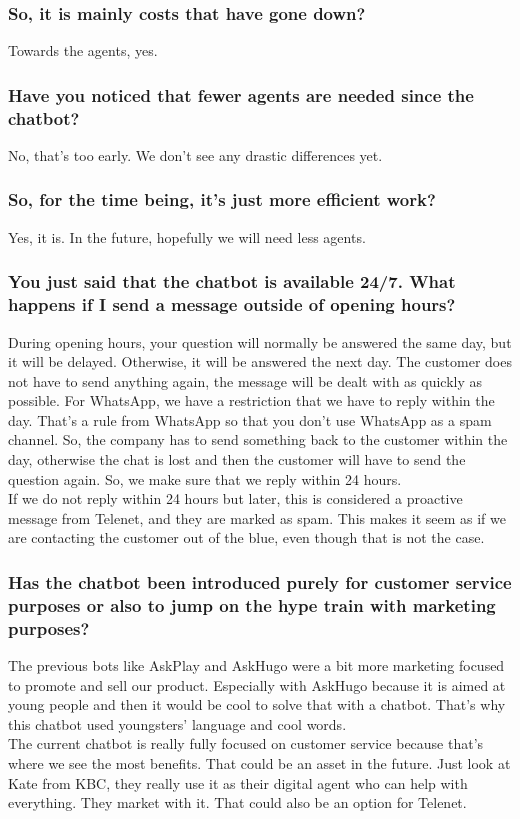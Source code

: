 \begin{appendices}
	\subsubsection{So, it is mainly costs that have gone down?}
	Towards the agents, yes.
	
	\subsubsection{Have you noticed that fewer agents are needed since the chatbot?}
	No, that's too early. We don't see any drastic differences yet.
	
	\subsubsection{So, for the time being, it's just more efficient work?}
	Yes, it is. In the future, hopefully we will need less agents.
	
	\subsubsection{You just said that the chatbot is available 24/7. What happens if I send a message outside of opening hours?}
	During opening hours, your question will normally be answered the same day, but it will be delayed. Otherwise, it will be answered the next day. The customer does not have to send anything again, the message will be dealt with as quickly as possible.
	For WhatsApp, we have a restriction that we have to reply within the day. That's a rule from WhatsApp so that you don't use WhatsApp as a spam channel. So, the company has to send something back to the customer within the day, otherwise the chat is lost and then the customer will have to send the question again. So, we make sure that we reply within 24 hours.\\
	\break
	If we do not reply within 24 hours but later, this is considered a proactive message from Telenet, and they are marked as spam. This makes it seem as if we are contacting the customer out of the blue, even though that is not the case.
	
	\subsubsection{Has the chatbot been introduced purely for customer service purposes or also to jump on the hype train with marketing purposes?}
	The previous bots like AskPlay and AskHugo were a bit more marketing focused to promote and sell our product. Especially with AskHugo because it is aimed at young people and then it would be cool to solve that with a chatbot. That's why this chatbot used youngsters' language and cool words.\\
	The current chatbot is really fully focused on customer service because that's where we see the most benefits. That could be an asset in the future. Just look at Kate from KBC, they really use it as their digital agent who can help with everything. They market with it. That could also be an option for Telenet.
	

\end{appendices}
